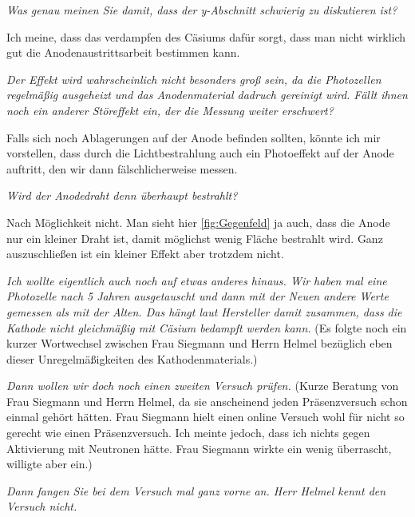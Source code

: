 \textit{Was genau meinen Sie damit, dass der y-Abschnitt schwierig zu diskutieren ist?}

Ich meine, dass das verdampfen des Cäsiums dafür sorgt, dass man nicht wirklich gut die Anodenaustrittsarbeit bestimmen kann. 

\textit{Der Effekt wird wahrscheinlich nicht besonders groß sein, da die Photozellen regelmäßig ausgeheizt und das Anodenmaterial 
dadruch gereinigt wird. Fällt ihnen noch ein anderer Störeffekt ein, der die Messung weiter erschwert?}

Falls sich noch Ablagerungen auf der Anode befinden sollten, könnte ich mir vorstellen, dass durch die Lichtbestrahlung auch ein Photoeffekt auf
der Anode auftritt, den wir dann fälschlicherweise messen.

\textit{Wird der Anodedraht denn überhaupt bestrahlt?}

Nach Möglichkeit nicht. Man sieht hier \ref{fig:Gegenfeld} ja auch, dass die Anode nur ein kleiner Draht ist, damit möglichst wenig Fläche 
bestrahlt wird. Ganz auszuschließen ist ein kleiner Effekt aber trotzdem nicht. 

\textit{Ich wollte eigentlich auch noch auf etwas anderes hinaus. Wir haben mal eine Photozelle nach 5 Jahren ausgetauscht und dann mit der 
Neuen andere Werte gemessen als mit der Alten. Das hängt laut Hersteller damit zusammen, dass die Kathode nicht gleichmäßig mit Cäsium 
bedampft werden kann.}
(Es folgte noch ein kurzer Wortwechsel zwischen Frau Siegmann und Herrn Helmel bezüglich eben dieser Unregelmäßigkeiten des Kathodenmaterials.)

\textit{Dann wollen wir doch noch einen zweiten Versuch prüfen.}
(Kurze Beratung von Frau Siegmann und Herrn Helmel, da sie anscheinend jeden Präsenzversuch schon einmal gehört hätten. Frau Siegmann hielt 
einen online Versuch wohl für nicht so gerecht wie einen Präsenzversuch. Ich meinte jedoch, dass ich nichts gegen Aktivierung mit Neutronen
hätte. Frau Siegmann wirkte ein wenig überrascht, willigte aber ein.)

\textit{Dann fangen Sie bei dem Versuch mal ganz vorne an. Herr Helmel kennt den Versuch nicht.}

